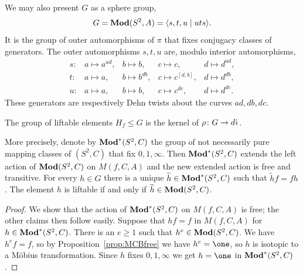\documentclass{amsart}
\begin{document}
We may also present $G$ as a sphere group,
\begin{equation}
\label{eq:def:ModGr:G}
G=\mathbf{\relax Mod}(S^2,A)=\langle s,t,u\mid u t s\rangle.
\end{equation}
It is the group of outer automorphisms of $\pi$ that fixes conjugacy
classes of generators. The outer automorphisms $s,t,u$ are, modulo
interior automorphisms,
\[\begin{array}{cllll}
  s: & a\mapsto a^{ad}, & b\mapsto b, & c\mapsto c, & d\mapsto d^{ad},\\
  t: & a\mapsto a, & b\mapsto b^{db}, & c\mapsto c^{[d,b]}, & d\mapsto d^{db},\\
  u: & a\mapsto a, & b\mapsto b, & c\mapsto c^{dc}, & d\mapsto d^{dc}.
\end{array}\]
These generators are respectively Dehn twists about the curves
$ad,db,dc$.

\begin{lem}\label{lem:Numb left orb of Belyi maps}
  The group of liftable elements $H_f\le G$ is the kernel of
  $\rho\colon G\to d{\stackrel{\downarrow}{\smash.}}$.

  More precisely, denote by $\mathbf{\relax Mod}^*(S^2,C)$ the group of not
  necessarily pure mapping classes of $(S^2,C)$ that fix
  $0,1,\infty$. Then $\mathbf{\relax Mod}^*(S^2,C)$ extends the left action of
  $\mathbf{\relax Mod}(S^2,C)$ on $M(f,C,A)$ and the new extended action is free and
  transitive. For every $h\in G$ there is a unique $\widetilde h\in
  \mathbf{\relax Mod}^*(S^2,C)$ such that $\widetilde h f= f h$. The element $h$ is
  liftable if and only if $\widetilde h\in \mathbf{\relax Mod}(S^2,C)$.
\end{lem}
\begin{proof}
  We show that the action of $\mathbf{\relax Mod}^*(S^2,C)$ on $M(f,C,A)$ is free;
  the other claims then follow easily. Suppose that $hf=f$ in
  $M(f,C,A)$ for $h\in \mathbf{\relax Mod}^*(S^2,C)$. There is an $e\ge 1$ such that
  $h^e\in \mathbf{\relax Mod}(S^2,C)$. We have $h^e f=f$, so by
  Proposition~\ref{prop:MCBfree} we have $h^e=\one$, so $h$ is
  isotopic to a M\"obius transformation. Since $h$ fixes $0,1,\infty$
  we get $h=\one$ in $\mathbf{\relax Mod}^*(S^2,C)$.
\end{proof}
\end{document}
